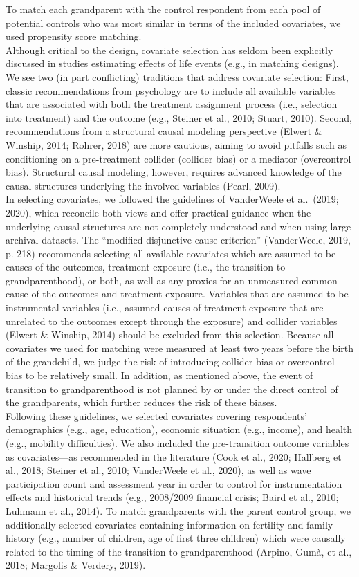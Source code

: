 \documentclass[
  english,
  man,floatsintext]{apa7}
\begin{document}
To match each grandparent with the control respondent from each pool of potential controls who was most similar in terms of the included covariates, we used propensity score matching.\\
Although critical to the design, covariate selection has seldom been explicitly discussed in studies estimating effects of life events (e.g., in matching designs). We see two (in part conflicting) traditions that address covariate selection: First, classic recommendations from psychology are to include all available variables that are associated with both the treatment assignment process (i.e., selection into treatment) and the outcome (e.g., Steiner et al., 2010; Stuart, 2010). Second, recommendations from a structural causal modeling perspective (Elwert \& Winship, 2014; Rohrer, 2018) are more cautious, aiming to avoid pitfalls such as conditioning on a pre-treatment collider (collider bias) or a mediator (overcontrol bias). Structural causal modeling, however, requires advanced knowledge of the causal structures underlying the involved variables (Pearl, 2009).\\
In selecting covariates, we followed the guidelines of VanderWeele et al.~(2019; 2020), which reconcile both views and offer practical guidance when the underlying causal structures are not completely understood and when using large archival datasets. The \enquote{modified disjunctive cause criterion} (VanderWeele, 2019, p. 218) recommends selecting all available covariates which are assumed to be causes of the outcomes, treatment exposure (i.e., the transition to grandparenthood), or both, as well as any proxies for an unmeasured common cause of the outcomes and treatment exposure. Variables that are assumed to be instrumental variables (i.e., assumed causes of treatment exposure that are unrelated to the outcomes except through the exposure) and collider variables (Elwert \& Winship, 2014) should be excluded from this selection. Because all covariates we used for matching were measured at least two years before the birth of the grandchild, we judge the risk of introducing collider bias or overcontrol bias to be relatively small. In addition, as mentioned above, the event of transition to grandparenthood is not planned by or under the direct control of the grandparents, which further reduces the risk of these biases.\\
Following these guidelines, we selected covariates covering respondents' demographics (e.g., age, education), economic situation (e.g., income), and health (e.g., mobility difficulties). We also included the pre-transition outcome variables as covariates---as recommended in the literature (Cook et al., 2020; Hallberg et al., 2018; Steiner et al., 2010; VanderWeele et al., 2020), as well as wave participation count and assessment year in order to control for instrumentation effects and historical trends (e.g., 2008/2009 financial crisis; Baird et al., 2010; Luhmann et al., 2014). To match grandparents with the parent control group, we additionally selected covariates containing information on fertility and family history (e.g., number of children, age of first three children) which were causally related to the timing of the transition to grandparenthood (Arpino, Gumà, et al., 2018; Margolis \& Verdery, 2019).\\
\end{document}
